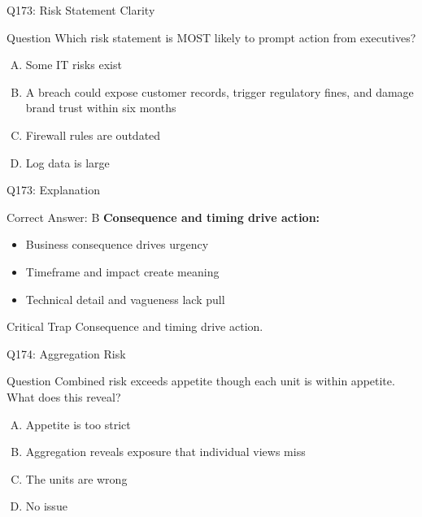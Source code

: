 \documentclass{beamer}
\begin{document}
	\begin{frame}{Q173: Risk Statement Clarity}
		\begin{block}{Question}
			Which risk statement is MOST likely to prompt action from executives?
		\end{block}
		\begin{enumerate}[(A)]
			\item Some IT risks exist
			\item A breach could expose customer records, trigger regulatory fines, and damage brand trust within six months
			\item Firewall rules are outdated
			\item Log data is large
		\end{enumerate}
	\end{frame}
	
	\begin{frame}{Q173: Explanation}
		\begin{block}{Correct Answer: B}
			\textbf{Consequence and timing drive action:}
			\begin{itemize}
				\item Business consequence drives urgency
				\item Timeframe and impact create meaning
				\item Technical detail and vagueness lack pull
			\end{itemize}
		\end{block}
		\begin{alertblock}{Critical Trap}
			Consequence and timing drive action.
		\end{alertblock}
	\end{frame}
	
	\begin{frame}{Q174: Aggregation Risk}
		\begin{block}{Question}
			Combined risk exceeds appetite though each unit is within appetite. What does this reveal?
		\end{block}
		\begin{enumerate}[(A)]
			\item Appetite is too strict
			\item Aggregation reveals exposure that individual views miss
			\item The units are wrong
			\item No issue
		\end{enumerate}
	\end{frame}
	
\end{document}
